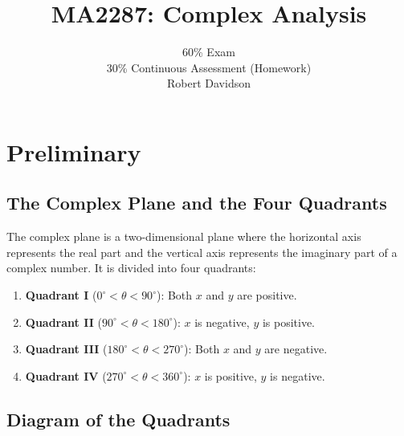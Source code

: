 \documentclass[a4paper, 10pt]{article}
\title{
\textbf{MA2287: Complex Analysis} \\ 
}
\author{
  60\% Exam\\
  30\% Continuous Assessment (Homework) \\
  Robert Davidson
}
\date{} %
\begin{document}
\maketitle
\pagebreak
\tableofcontents
\pagebreak


\section{Preliminary}
\subsection{The Complex Plane and the Four Quadrants}

The complex plane is a two-dimensional plane where the horizontal axis represents the real part and the vertical axis represents the imaginary part of a complex number. It is divided into four quadrants:

\begin{enumerate}
  \item \textbf{Quadrant I} ($0^\circ < \theta < 90^\circ$): Both $x$ and $y$ are positive.
  \item \textbf{Quadrant II} ($90^\circ < \theta < 180^\circ$): $x$ is negative, $y$ is positive.
  \item \textbf{Quadrant III} ($180^\circ < \theta < 270^\circ$): Both $x$ and $y$ are negative.
  \item \textbf{Quadrant IV} ($270^\circ < \theta < 360^\circ$): $x$ is positive, $y$ is negative.
\end{enumerate}

\hfill

\subsection{Diagram of the Quadrants}

\begin{center}
\end{center}
\end{document}

